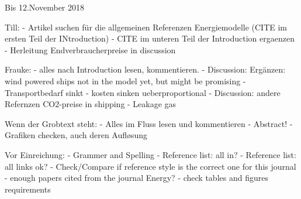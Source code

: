 Bis 12.November 2018

Till:
- Artikel suchen für die allgemeinen Referenzen Energiemodelle (CITE im ersten Teil der INtroduction)
- CITE im unteren Teil der Introduction ergaenzen
- Herleitung Endverbraucherpreise in discussion

Frauke:
- alles nach Introduction lesen, kommentieren.
- Discussion: Ergänzen: wind powered ships not in the model yet, but might be promising
- Transportbedarf sinkt - kosten sinken ueberproportional
- Discussion: andere Refernzen CO2-preise in shipping
- Leakage gas

Wenn der Grobtext steht:
- Alles im Fluss lesen und kommentieren
- Abstract!
- Grafiken checken, auch deren Aufløsung


Vor Einreichung:
- Grammer and Spelling
- Reference list: all in?
- Reference list: all links ok?
- Check/Compare if reference style is the correct one for this journal
- enough papers cited from the journal Energy?
- check tables and figures requirements

